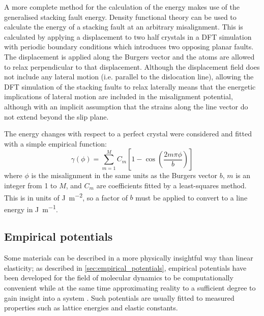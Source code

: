 A more complete method for the calculation of the energy makes use of the generalised stacking fault energy. Density functional theory can be used to calculate the energy of a stacking fault at an arbitrary misalignment. This is calculated by applying a displacement to two half crystals in a DFT simulation with periodic boundary conditions which introduces two opposing planar faults. The displacement is applied along the Burgers vector and the atoms are allowed to relax perpendicular to that displacement. Although the displacement field does not include any lateral motion (i.e. parallel to the dislocation line), allowing the DFT simulation of the stacking faults to relax laterally means that the energetic implications of lateral motion are included in the misalignment potential, although with an implicit assumption that the strains along the line vector do not extend beyond the slip plane. 

The energy changes with respect to a perfect crystal were considered and fitted with a simple empirical function:
\begin{equation}
\gamma(\phi) = \sum^{M}_{m=1} C_m \left[ 1 - \cos \left( \frac{2m\pi \phi}{b} \right) \right]
\end{equation}
where $\phi$ is the misalignment in the same units as the Burgers vector $b$, $m$ is an integer from \num{1} to $M$, and $C_m$ are coefficients fitted by a least-squares method. This is in units of \si{\joule\per\square\meter}, so a factor of $b$ must be applied to convert to a line energy in \si{\joule\per\meter}.












\subsection{Empirical potentials}

Some materials can be described in a more physically insightful way than linear elasticity; as described in \autoref{sec:empirical_potentials}, empirical potentials have been developed for the field of molecular dynamics to be computationally convenient while at the same time approximating reality to a sufficient degree to gain insight into a system \cite{martinez2013}. Such potentials are usually fitted to measured properties such as lattice energies and elastic constants.

